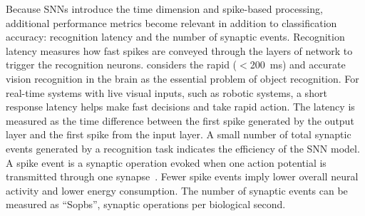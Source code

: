 Because SNNs introduce the time dimension and spike-based processing, additional performance metrics become relevant in addition to classification accuracy: recognition latency and the number of synaptic events.
Recognition latency measures how fast spikes are conveyed through the layers of network to trigger the recognition neurons.
\cite{dicarlo2012does} considers the rapid ($<$200~ms) and accurate vision recognition in the brain as the essential problem of object recognition.
For real-time systems with live visual inputs, such as robotic systems, a short response latency helps make fast decisions and take rapid action.
The latency is measured as the time difference between the first spike generated by the output layer and the first spike from the input layer.
A small number of total synaptic events generated by a recognition task indicates the efficiency of the SNN model.
A spike event is a synaptic operation evoked when one action potential is transmitted through one synapse~\cite{sharp2012power}.
Fewer spike events imply lower overall neural activity and lower energy consumption.
The number of synaptic events can be measured as ``Sopbs'', synaptic operations per biological second.
%			
